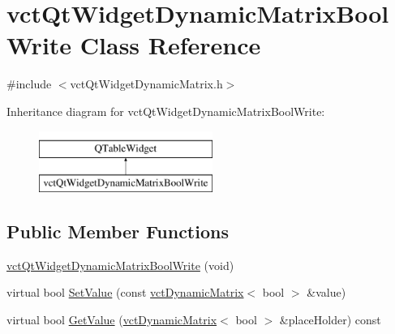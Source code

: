 \hypertarget{classvct_qt_widget_dynamic_matrix_bool_write}{\section{vct\-Qt\-Widget\-Dynamic\-Matrix\-Bool\-Write Class Reference}
\label{classvct_qt_widget_dynamic_matrix_bool_write}
}


{\ttfamily \#include $<$vct\-Qt\-Widget\-Dynamic\-Matrix.\-h$>$}

Inheritance diagram for vct\-Qt\-Widget\-Dynamic\-Matrix\-Bool\-Write\-:\begin{figure}[H]
\begin{center}
\leavevmode
\includegraphics[height=2.000000cm]{db/df8/classvct_qt_widget_dynamic_matrix_bool_write}
\end{center}
\end{figure}
\subsection*{Public Member Functions}
\begin{DoxyCompactItemize}
\item 
\hyperlink{classvct_qt_widget_dynamic_matrix_bool_write_a87984c026867122045c67f4f88b708f6}{vct\-Qt\-Widget\-Dynamic\-Matrix\-Bool\-Write} (void)
\item 
virtual bool \hyperlink{classvct_qt_widget_dynamic_matrix_bool_write_ac657c586ab74604974c2906e9609433a}{Set\-Value} (const \hyperlink{classvct_dynamic_matrix}{vct\-Dynamic\-Matrix}$<$ bool $>$ \&value)
\item 
virtual bool \hyperlink{classvct_qt_widget_dynamic_matrix_bool_write_ad01e3f73667d5017fd1c93494a0db295}{Get\-Value} (\hyperlink{classvct_dynamic_matrix}{vct\-Dynamic\-Matrix}$<$ bool $>$ \&place\-Holder) const 
\end{DoxyCompactItemize}


